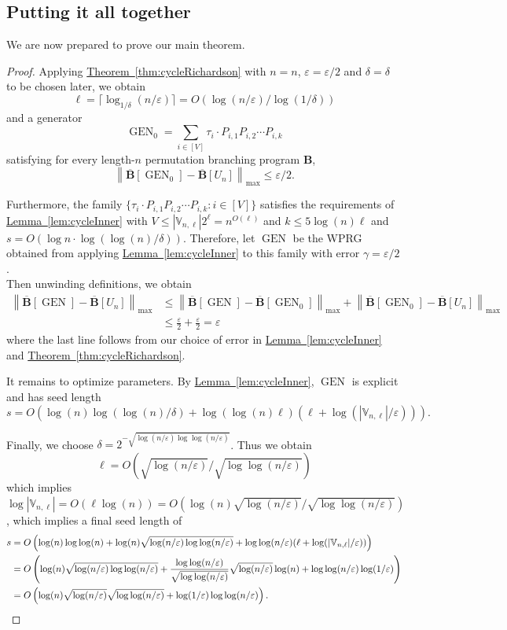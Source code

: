 \documentclass[11pt]{article}
\numberwithin{equation}{section}
\theoremstyle{definition}
\theoremstyle{plain}
\newcommand{\expref}[2]{\hyperref[#2]{#1~\ref{#2}}}
\newcommand{\eps}{\varepsilon}
\newcommand{\lbar}{\left\|}
\newcommand{\rbar}{\right\|}
\newcommand{\vnl}{\mathbb{V}_{n,\ell}}
\DeclareMathOperator{\gen}{GEN}
\newcommand{\bp}{{\mathbf{B}}}
\newcommand{\bbp}{\overline{\mathbf{B}}}
\begin{document}
\subsection{Putting it all together}
We are now prepared to prove our main theorem.
\cycleMatrix*
\begin{proof}
Applying \expref{Theorem}{thm:cycleRichardson} with $n=n$, $\eps=\eps/2$ and $\delta=\delta$ to be chosen later, we obtain 
$$\ell=\lceil \log_{1/\delta}(n/\eps)\rceil = O(\log(n/\eps)/\log(1/\delta))$$ 
and a generator
\[\gen_0 = \sum_{i\in [V]}\tau_i\cdot P_{i,1}P_{i,2}\cdots P_{i,k}\]
satisfying for every length-$n$ permutation branching program $\bp$,
$$\lbar\bbp[\gen_0] - \bbp[U_n]\rbar_{\max}\leq \eps/2.$$

Furthermore, the family $\{\tau_i\cdot P_{i,1}P_{i,2}\cdots P_{i,k}:i\in [V]\}$ satisfies the requirements of \expref{Lemma}{lem:cycleInner} with $V\leq |\vnl|2^\ell=n^{O(\ell)}$ and $k\leq 5\log(n)\ell$ and $s=O(\log n\cdot\log(\log(n)/\delta))$. Therefore, let $\gen$ be the WPRG obtained from applying \expref{Lemma}{lem:cycleInner} to this family with error $\gamma=\eps/2$.\\

Then unwinding definitions, we obtain
\begin{align*}
    \lbar\bbp[\gen]-\bbp[U_n]\rbar_{\max} &\leq \lbar\bbp[\gen]- \bbp[\gen_0]\rbar_{\max}+ \left\|\bbp[\gen_0] - \bbp[U_n]\right\|_{\max}\\
    &\leq \frac{\eps}{2}+\frac{\eps}{2} = \eps
\end{align*}
where the last line follows from our choice of error in \expref{Lemma}{lem:cycleInner} and \expref{Theorem}{thm:cycleRichardson}.

It remains to optimize parameters. By \expref{Lemma}{lem:cycleInner}, $\gen$ is explicit and has seed length
\[s=O\left(\log(n)\log(\log(n)/\delta) + \log(\log(n)\ell)(\ell+\log(|\vnl|/\eps))\right).\]

Finally, we choose $\delta=2^{-\sqrt{\log(n/\eps)\log\log(n/\eps)}}$. Thus we obtain 
$$\ell=O\left(\sqrt{\log(n/\eps)}/\sqrt{\log\log(n/\eps)}\right)$$
which implies $\log|\vnl|=O(\ell\log(n))=O\left(\log(n)\sqrt{\log(n/\eps)}/\sqrt{\log\log(n/\eps)}\right)$, which implies a final seed length of
\begin{align*}
    s &= O\left(\log(n)\log\log(n) +\log(n)\sqrt{\log(n/\eps)\log\log(n/\eps)} + \log\log(n/\eps)(\ell+\log(|\vnl|/\eps))\right)\\
    &= O\left(\log(n)\sqrt{\log(n/\eps)\log\log(n/\eps)} + \frac{\log\log(n/\eps)}{\sqrt{\log\log(n/\eps)}}\sqrt{\log(n/\eps)}\log(n)+\log\log(n/\eps)\log(1/\eps)\right)\\
    &= O\left(\log(n)\sqrt{\log(n/\eps)}\sqrt{\log\log(n/\eps)}+ \log(1/\eps)\log\log(n/\eps)\right). \qedhere
\end{align*}
\end{proof}
\end{document}
